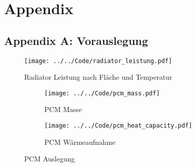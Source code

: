 \chapter*{Appendix}
\label{chapter:Appendix}
\pagestyle{Appendix}

\section*{Appendix A: Vorauslegung}\label{Anh:programmcode}

\begin{figure}[H]
  \centering
  \texttt{[image: ../../Code/radiator\_leistung.pdf]}
  \caption{Radiator Leistung nach Fläche und Temperatur}\label{fig:radiator_flaeche_leistung}
\end{figure}

\begin{figure}[H]
    \centering
    \begin{subfigure}{0.9\textwidth}
        \centering
        \texttt{[image: ../../Code/pcm\_mass.pdf]}
        \caption{PCM Masse}\label{fig:pcm_mass}
    \end{subfigure}
    \vspace{1em}  %
    \begin{subfigure}{0.9\textwidth}
        \centering
        \texttt{[image: ../../Code/pcm\_heat\_capacity.pdf]}
        \caption{PCM Wärmeaufnahme}\label{fig:pcm_heat}
    \end{subfigure}
    \caption{PCM Auslegung}\label{fig:pcm_mass_heat}
\end{figure}

\newpage

